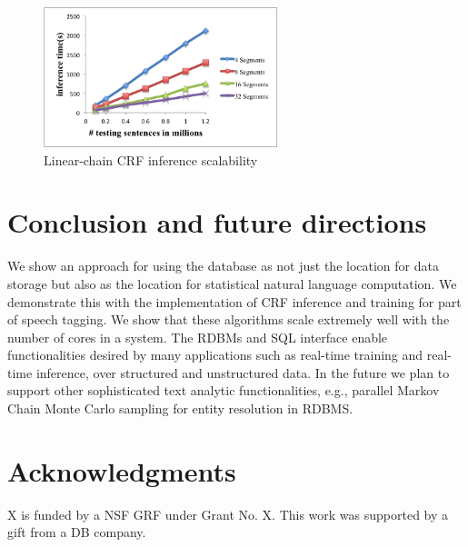 \documentclass[11pt,letterpaper]{article}
\begin{document}
\begin{figure}
\centering
\includegraphics[height=11em]{testing}
\caption{Linear-chain CRF inference scalability}
\label{fig:crftest}
\end{figure}


\section{Conclusion and future directions}
We show an approach for using the database as not just the location for
data storage but also as the location for statistical natural language 
computation.
We demonstrate this with the implementation of CRF inference and training 
for part of speech tagging.
We show that these algorithms scale extremely well with the number of cores
in a system.
The RDBMs and SQL interface enable functionalities desired by many 
applications such as real-time training and real-time inference, over
structured and unstructured data.
In the future we plan to support other sophisticated text analytic functionalities,
e.g., parallel Markov Chain Monte Carlo sampling 
for entity resolution in RDBMS.




\section*{Acknowledgments}
X is funded by a NSF GRF under Grant No. X. %
This work was supported by a gift from a DB company. %


%

\end{document}
